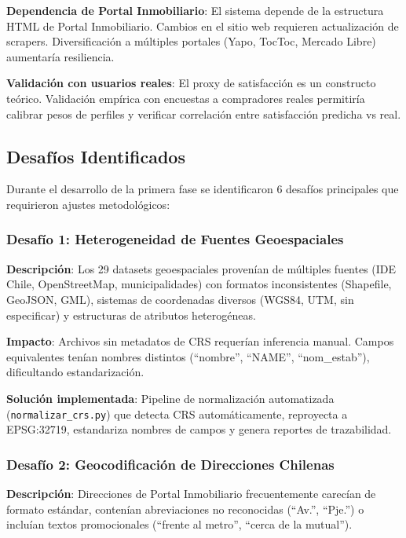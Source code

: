 \textbf{Dependencia de Portal Inmobiliario}: El sistema depende de la estructura HTML de Portal Inmobiliario. Cambios en el sitio web requieren actualización de scrapers. Diversificación a múltiples portales (Yapo, TocToc, Mercado Libre) aumentaría resiliencia.

\textbf{Validación con usuarios reales}: El proxy de satisfacción es un constructo teórico. Validación empírica con encuestas a compradores reales permitiría calibrar pesos de perfiles y verificar correlación entre satisfacción predicha vs real.

\subsection{Desafíos Identificados}

Durante el desarrollo de la primera fase se identificaron 6 desafíos principales que requirieron ajustes metodológicos:

\subsubsection{Desafío 1: Heterogeneidad de Fuentes Geoespaciales}

\textbf{Descripción}: Los 29 datasets geoespaciales provenían de múltiples fuentes (IDE Chile, OpenStreetMap, municipalidades) con formatos inconsistentes (Shapefile, GeoJSON, GML), sistemas de coordenadas diversos (WGS84, UTM, sin especificar) y estructuras de atributos heterogéneas.

\textbf{Impacto}: Archivos sin metadatos de CRS requerían inferencia manual. Campos equivalentes tenían nombres distintos (``nombre'', ``NAME'', ``nom\_estab''), dificultando estandarización.

\textbf{Solución implementada}: Pipeline de normalización automatizada (\texttt{normalizar\_crs.py}) que detecta CRS automáticamente, reproyecta a EPSG:32719, estandariza nombres de campos y genera reportes de trazabilidad.

\subsubsection{Desafío 2: Geocodificación de Direcciones Chilenas}

\textbf{Descripción}: Direcciones de Portal Inmobiliario frecuentemente carecían de formato estándar, contenían abreviaciones no reconocidas (``Av.'', ``Pje.'') o incluían textos promocionales (``frente al metro'', ``cerca de la mutual'').

